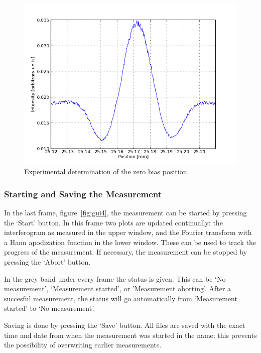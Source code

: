 \begin{figure}[!ht]
 \begin{center}
  \includegraphics[width=\textwidth]{figures/peakposition}
  \caption{Experimental determination of the zero bias position.}
  \label{fig:peakposition}
 \end{center}
\end{figure}


\subsubsection{Starting and Saving the Measurement}\label{subsub:saving}

In the last frame, figure~\ref{fig:gui4}, the measurement can be started by pressing the `Start' button. In this frame two plots are updated continually: the interferogram as measured in the upper window, and the Fourier transform with a Hann apodization function in the lower window. These can be used to track the progress of the measurement. If necessary, the measurement can be stopped by pressing the `Abort' button.

In the grey band under every frame the status is given. This can be `No measurement', `Measurement started', or 'Measurement aborting'. After a succesful measurement, the status will go automatically from `Measurement started' to `No measurement'.

Saving is done by pressing the `Save' button. All files are saved with the exact time and date from when the measurement was started in the name; this prevents the possibility of overwriting earlier measurements.

